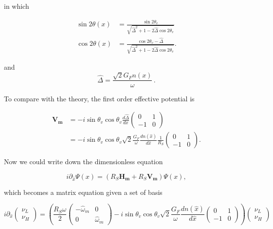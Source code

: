 \documentclass{tufte-handout}
\begin{document}
in which

\begin{align*}
\sin 2\theta(x)  &= \frac{\sin 2\theta_v}{\sqrt{ \hat\Delta ^2+1 - 2 \hat\Delta \cos 2\theta_v }} \\
\cos 2\theta(x)&= \frac{ \cos 2\theta_v - \hat\Delta  }{ \sqrt{\hat\Delta ^2  +1 - 2 \hat\Delta \cos 2\theta_v } }.
\end{align*}

and
\begin{equation*}
\hat\Delta = \frac{\sqrt{2}G_F n(x)}{\omega} \, .
\end{equation*}


To compare with the theory, the first order effective potential is

\begin{align*}
\mathbf{V_m} & = - i\sin\theta_v \cos\theta_v \frac{d\hat\Delta}{dx} \begin{pmatrix}
0 & 1 \\
-1 & 0
\end{pmatrix}\\
& = -i \sin\theta_v\cos\theta_v \sqrt{2}\frac{G_F}{\omega} \frac{d n(\hat x)}{d\hat x} \frac{1}{R_S} \begin{pmatrix}
0 & 1 \\
-1 & 0
\end{pmatrix}.
\end{align*}

Now we could write down the dimensionless equation

\begin{equation*}
i \partial_{\hat x} \Psi(x) = ( R_S \mathbf{H_m} + R_S \mathbf{V_m} ) \Psi(x),
\end{equation*}

which becomes a matrix equation given a set of basis

\begin{equation*}
i \partial_{\hat x} \begin{pmatrix}
\nu_L \\
\nu_H
\end{pmatrix} = \left(
\frac{R_S \omega}{2} \begin{pmatrix}
- \hat{\omega}_m & 0 \\
0 & \hat{\omega}_m
\end{pmatrix} - i \sin\theta_v\cos\theta_v \sqrt{2} \frac{G_F}{\omega} \frac{d n(\hat x)}{d\hat x} \begin{pmatrix}
0 & 1 \\
-1 & 0
\end{pmatrix}
\right)  
\begin{pmatrix}
\nu_L \\
\nu_H
\end{pmatrix}
\end{equation*}
\end{document}
